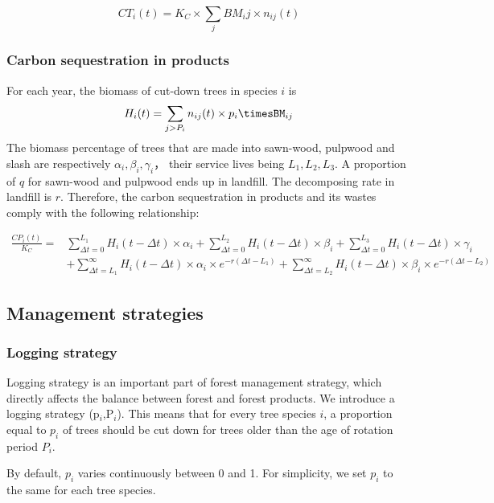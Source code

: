 \begin{equation}
    CT_i(t) = K_C\times \sum_{j}BM_ij\times n_{ij}(t)
\end{equation}

\subsubsection{Carbon sequestration in products}
For each year, the biomass of cut-down trees in species $i$ is
\begin{equation}
    H_i(t)=\sum_{j>P_i}n_{ij}(t)\times p_i\timesBM_{ij}
\end{equation}
The biomass percentage of trees that are made into sawn-wood, pulpwood and slash are respectively $\alpha_i,\beta_i,\gamma_i$， their service lives being $L_1,L_2,L_3$. A proportion of $q$ for sawn-wood and pulpwood ends up in landfill. The decomposing rate in landfill is $r$. Therefore, the carbon sequestration in products and its wastes comply with the following relationship:

\begin{equation}
\begin{aligned}
    \frac{CP_i(t)}{K_C}=&\sum_{\Delta t=0}^{L_1}H_i(t-\Delta t)\times \alpha_i+\sum_{\Delta t=0}^{L_2}H_i(t-\Delta t)\times \beta_i+\sum_{\Delta t=0}^{L_3}H_i(t-\Delta t)\times \gamma_i\\
    &+\sum_{\Delta t=L_1}^{\infty}H_i(t-\Delta t)\times \alpha_i\times e^{-r(\Delta t-L_1)}+\sum_{\Delta t=L_2}^{\infty}H_i(t-\Delta t)\times \beta_i\times e^{-r(\Delta t-L_2)}
\end{aligned}
\end{equation}

\subsection{Management strategies}
\subsubsection{Logging strategy}
Logging strategy is an important part of forest management strategy, which directly affects the balance between forest and forest products. We introduce a logging strategy (p$_i$,P$_i$). This means that for every tree species $i$, a proportion equal to $p_{i}$ of trees should be cut down for trees older than the age of rotation period $P_i$.

By default, $p_i$ varies continuously between 0 and 1. For simplicity, we set $p_i$  to the same for each tree species.

